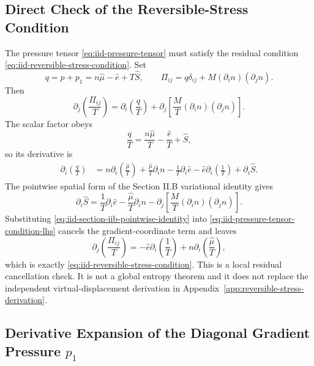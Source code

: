 \subsection{Direct Check of the Reversible-Stress Condition}

The pressure tensor \eqref{eq:iid-pressure-tensor} must satisfy the residual
condition \eqref{eq:iid-reversible-stress-condition}.  Set
\[
  q=p+p_1=n\hat\mu-\hat e+T\hat S,
  \qquad
  \Pi_{ij}=q\delta_{ij}+M(\partial_i n)(\partial_j n).
\]
Then
\begin{equation}
  \partial_j\left(\frac{\Pi_{ij}}{T}\right)
  =
  \partial_i\left(\frac{q}{T}\right)
  +
  \partial_j\left[\frac{M}{T}(\partial_i n)(\partial_j n)\right].
  \label{eq:iid-pressure-tensor-condition-lhs}
\end{equation}
The scalar factor obeys
\[
  \frac{q}{T}=\frac{n\hat\mu}{T}-\frac{\hat e}{T}+\hat S,
\]
so its derivative is
\begin{align}
  \partial_i\left(\frac{q}{T}\right)
  &=
  n\partial_i\left(\frac{\hat\mu}{T}\right)
  +\frac{\hat\mu}{T}\partial_i n
  -\frac1T\partial_i\hat e
  -\hat e\partial_i\left(\frac1T\right)
  +\partial_i\hat S .
\end{align}
The pointwise spatial form of the Section II.B variational identity gives
\begin{equation}
  \partial_i\hat S
  =
  \frac1T\partial_i\hat e
  -\frac{\hat\mu}{T}\partial_i n
  -
  \partial_j\left[\frac{M}{T}(\partial_i n)(\partial_j n)\right].
  \label{eq:iid-section-iib-pointwise-identity}
\end{equation}
Substituting \eqref{eq:iid-section-iib-pointwise-identity} into
\eqref{eq:iid-pressure-tensor-condition-lhs} cancels the gradient-coordinate
term and leaves
\begin{equation}
  \partial_j\left(\frac{\Pi_{ij}}{T}\right)
  =
  -\hat e\partial_i\left(\frac1T\right)
  +
  n\partial_i\left(\frac{\hat\mu}{T}\right),
\end{equation}
which is exactly \eqref{eq:iid-reversible-stress-condition}.  This is a local
residual cancellation check.  It is not a global entropy theorem and it does
not replace the independent virtual-displacement derivation in
Appendix~\ref{app:reversible-stress-derivation}.

\subsection{Derivative Expansion of the Diagonal Gradient Pressure
\texorpdfstring{\(p_1\)}{p1}}

